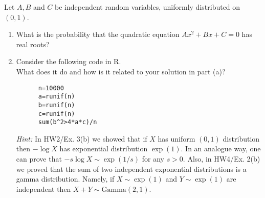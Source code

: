 
\begin{exercise}

Let $A, B$ and $C$ be independent random variables, uniformly distributed on $(0,1)$.

\begin{enumerate}[label = (\alph*)]
  \item What is the probability that the quadratic equation $Ax^2 + Bx + C = 0$ has real roots?
  \item Consider the following code in \textsc{R}. \\
  What does it do and how is it related to your solution in part (a)?
  \begin{lstlisting}
      n=10000
      a=runif(n)
      b=runif(n)
      c=runif(n)
      sum(b^2>4*a*c)/n
  \end{lstlisting}
  \textit{Hint:} In HW2/Ex. 3(b) we showed that if $X$ has uniform $(0,1)$
  distribution then $- \log X$ has exponential distribution $\exp(1)$.
  In an analogue way, one can prove that $- s \log X \sim \exp(1/s)$
  for any $s > 0$. Also, in HW4/Ex. 2(b) we proved that the sum of two
  independent exponential distributions is a gamma distribution.
  Namely, if $X \sim \exp(1)$ and $Y \sim \exp(1)$ are independent then
  $X + Y \sim \text{Gamma}(2,1)$.
\end{enumerate}

\end{exercise}


